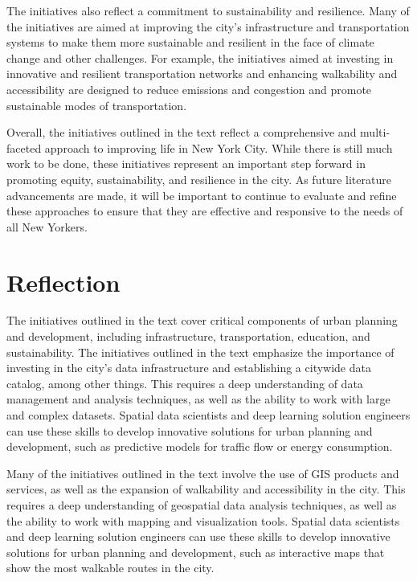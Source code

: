 \documentclass[
  letterpaper,
  DIV=11,
  numbers=noendperiod]{scrreprt}
\begin{document}
The initiatives also reflect a commitment to sustainability and
resilience. Many of the initiatives are aimed at improving the city's
infrastructure and transportation systems to make them more sustainable
and resilient in the face of climate change and other challenges. For
example, the initiatives aimed at investing in innovative and resilient
transportation networks and enhancing walkability and accessibility are
designed to reduce emissions and congestion and promote sustainable
modes of transportation.

Overall, the initiatives outlined in the text reflect a comprehensive
and multi-faceted approach to improving life in New York City. While
there is still much work to be done, these initiatives represent an
important step forward in promoting equity, sustainability, and
resilience in the city. As future literature advancements are made, it
will be important to continue to evaluate and refine these approaches to
ensure that they are effective and responsive to the needs of all New
Yorkers.

\hypertarget{reflection-2}{%
\section{Reflection}\label{reflection-2}}

The initiatives outlined in the text cover critical components of urban
planning and development, including infrastructure, transportation,
education, and sustainability. The initiatives outlined in the text
emphasize the importance of investing in the city's data infrastructure
and establishing a citywide data catalog, among other things. This
requires a deep understanding of data management and analysis
techniques, as well as the ability to work with large and complex
datasets. Spatial data scientists and deep learning solution engineers
can use these skills to develop innovative solutions for urban planning
and development, such as predictive models for traffic flow or energy
consumption.

Many of the initiatives outlined in the text involve the use of GIS
products and services, as well as the expansion of walkability and
accessibility in the city. This requires a deep understanding of
geospatial data analysis techniques, as well as the ability to work with
mapping and visualization tools. Spatial data scientists and deep
learning solution engineers can use these skills to develop innovative
solutions for urban planning and development, such as interactive maps
that show the most walkable routes in the city.
\end{document}
